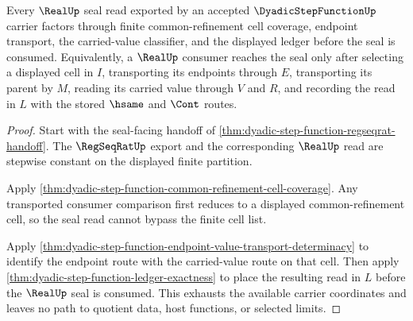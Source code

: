 \begin{theorem}
\label{thm:dyadic-step-function-real-seal-window-exactness}
Every $\RealUp$ seal read exported by an accepted $\DyadicStepFunctionUp$ carrier factors through finite common-refinement cell coverage, endpoint transport, the carried-value classifier, and the displayed ledger before the seal is consumed. Equivalently, a $\RealUp$ consumer reaches the seal only after selecting a displayed cell in $I$, transporting its endpoints through $E$, transporting its parent by $M$, reading its carried value through $V$ and $R$, and recording the read in $L$ with the stored $\hsame$ and $\Cont$ routes.
\end{theorem}
\begin{proof}
Start with the seal-facing handoff of \autoref{thm:dyadic-step-function-regseqrat-handoff}. The $\RegSeqRatUp$ export and the corresponding $\RealUp$ read are stepwise constant on the displayed finite partition.

Apply \autoref{thm:dyadic-step-function-common-refinement-cell-coverage}. Any transported consumer comparison first reduces to a displayed common-refinement cell, so the seal read cannot bypass the finite cell list.

Apply \autoref{thm:dyadic-step-function-endpoint-value-transport-determinacy} to identify the endpoint route with the carried-value route on that cell. Then apply \autoref{thm:dyadic-step-function-ledger-exactness} to place the resulting read in $L$ before the $\RealUp$ seal is consumed. This exhausts the available carrier coordinates and leaves no path to quotient data, host functions, or selected limits.
\end{proof}

